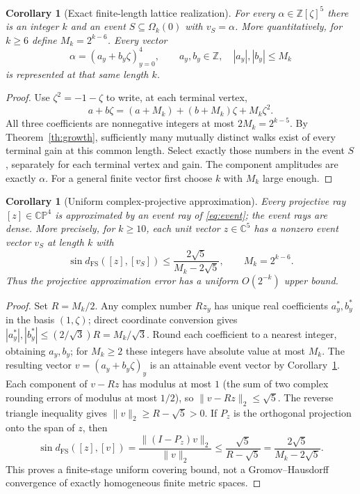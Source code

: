 \documentclass[11pt]{article}
\newtheorem{corollary}[theorem]{Corollary}
\newcommand{\Z}{\mathbb Z}
\newcommand{\C}{\mathbb C}
\newcommand{\FS}{\mathrm{FS}}
\begin{document}
\begin{corollary}[Exact finite-length lattice realization]\label{cor:lattice}
For every $\alpha\in\Z[\zeta]^5$ there is an integer $k$ and an event $S\subseteq\Omega_k(0)$ with $v_S=\alpha$. More quantitatively, for $k\ge6$ define $M_k=2^{k-6}$. Every vector
\[
 \alpha=(a_y+b_y\zeta)_{y=0}^4,
 \qquad a_y,b_y\in\Z,\quad |a_y|,|b_y|\le M_k
\]
is represented \emph{at that same length} $k$.
\end{corollary}
\begin{proof}
Use $\zeta^2=-1-\zeta$ to write, at each terminal vertex,
\[
 a+b\zeta=(a+M_k)+(b+M_k)\zeta+M_k\zeta^2.
\]
All three coefficients are nonnegative integers at most $2M_k=2^{k-5}$. By Theorem~\ref{th:growth}, sufficiently many mutually distinct walks exist of every terminal gain at this common length. Select exactly those numbers in the event $S$, separately for each terminal vertex and gain. The component amplitudes are exactly $\alpha$. For a general finite vector first choose $k$ with $M_k$ large enough.\qedhere
\end{proof}

\begin{corollary}[Uniform complex-projective approximation]\label{cor:net}
Every projective ray $[z]\in\C\mathbb P^4$ is approximated by an event ray of \eqref{eq:event}; the event rays are dense. More precisely, for $k\ge10$, each unit vector $z\in\C^5$ has a nonzero event vector $v_S$ at length $k$ with
\begin{equation}
 \sin d_{\FS}([z],[v_S])\le
 \frac{2\sqrt5}{M_k-2\sqrt5},\qquad M_k=2^{k-6}.
 \label{eq:uniform}
\end{equation}
Thus the projective approximation error has a uniform $O(2^{-k})$ upper bound.
\end{corollary}
\begin{proof}
Set $R=M_k/2$. Any complex number $Rz_y$ has unique real coefficients $a_y^*,b_y^*$ in the basis $(1,\zeta)$; direct coordinate conversion gives
$|a_y^*|,|b_y^*|\le (2/\sqrt3)R=M_k/\sqrt3$.
Round each coefficient to a nearest integer, obtaining $a_y,b_y$; for $M_k\ge2$ these integers have absolute value at most $M_k$. The resulting vector $v=(a_y+b_y\zeta)_y$ is an attainable event vector by Corollary~\ref{cor:lattice}. Each component of $v-Rz$ has modulus at most $1$ (the sum of two complex rounding errors of modulus at most $1/2$), so $\|v-Rz\|_2\le\sqrt5$. The reverse triangle inequality gives $\|v\|_2\ge R-\sqrt5>0$. If $P_z$ is the orthogonal projection onto the span of $z$, then
\[
 \sin d_{\FS}([z],[v])
 =\frac{\|(I-P_z)v\|_2}{\|v\|_2}
 \le\frac{\sqrt5}{R-\sqrt5}
 =\frac{2\sqrt5}{M_k-2\sqrt5}.
\]
This proves a finite-stage uniform covering bound, not a Gromov--Hausdorff convergence of exactly homogeneous finite metric spaces.\qedhere
\end{proof}
\end{document}
